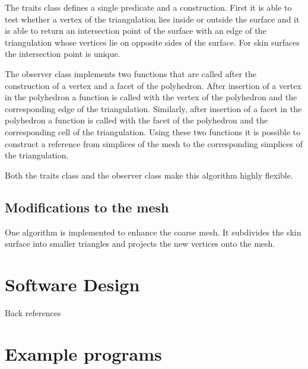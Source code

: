 The traits class defines a single predicate and a construction. First
it is able to test whether a vertex of the triangulation lies inside
or outside the surface and it is able to return an intersection point
of the surface with an edge of the triangulation whose vertices lie on
opposite sides of the surface. For skin surfaces the intersection
point is unique.

The observer class implements two functions that are called after the
construction of a vertex and a facet of the polyhedron. After
insertion of a vertex in the polyhedron a function is called with the
vertex of the polyhedron and the corresponding edge of the
triangulation. Similarly, after insertion of a facet in the polyhedron
a function is called with the facet of the polyhedron and the
corresponding cell of the triangulation. Using these two functions it
is possible to construct a reference from simplices of the mesh to the
corresponding simplices of the triangulation.

Both the traits class and the observer class make this algorithm highly
flexible.
\subsection{Modifications to the mesh}
One algorithm is implemented to enhance the coarse mesh. It subdivides
the skin surface into smaller triangles and projects the new vertices
onto the mesh.
\section{Software Design}
Back references
\section{Example programs}


